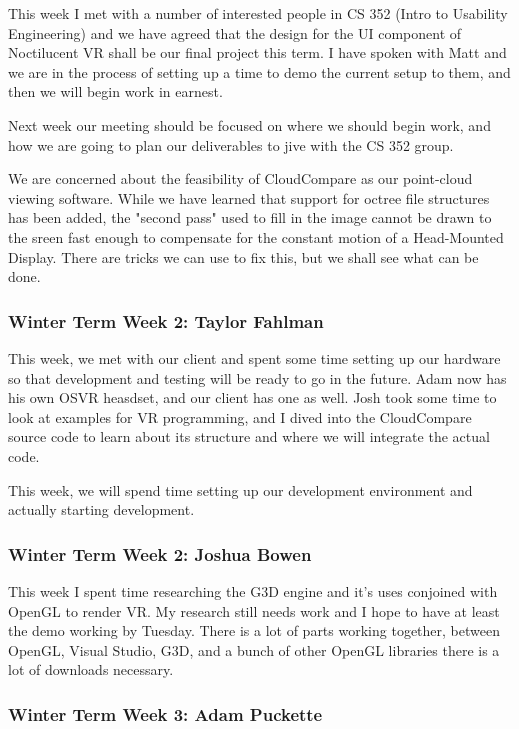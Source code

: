 \documentclass[draftclsnofoot,onecolumn]{IEEEtran}
\begin{document}
This week I met with a number of interested people in CS 352 (Intro to Usability Engineering) and we have agreed that the design for the UI component of Noctilucent VR shall be our final project this term. I have spoken with Matt and we are in the process of setting up a time to demo the current setup to them, and then we will begin work in earnest.

Next week our meeting should be focused on where we should begin work, and how we are going to plan our deliverables to jive with the CS 352 group.

We are concerned about the feasibility of CloudCompare as our point-cloud viewing software. While we have learned that support for octree file structures has been added, the "second pass" used to fill in the image cannot be drawn to the sreen fast enough to compensate for the constant motion of a Head-Mounted Display. There are tricks we can use to fix this, but we shall see what can be done.

\subsubsection{Winter Term Week 2: Taylor Fahlman}

This week, we met with our client and spent some time setting up our hardware so that development and testing will be ready to go in the future. Adam now has his own OSVR heasdset, and our client has one as well. Josh took some time to look at examples for VR programming, and I dived into the CloudCompare source code to learn about its structure and where we will integrate the actual code.

This week, we will spend time setting up our development environment and actually starting development.

\subsubsection{Winter Term Week 2: Joshua Bowen}

This week I spent time researching the G3D engine and it's uses conjoined with OpenGL to render VR. My research still needs work and I hope to have at least the demo working by Tuesday. There is a lot of parts working together, between OpenGL, Visual Studio, G3D, and a bunch of other OpenGL libraries there is a lot of downloads necessary.

\subsubsection{Winter Term Week 3: Adam Puckette}
\end{document}
